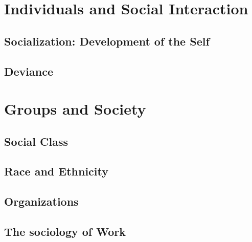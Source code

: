 \documentclass[12pt,a4paper]{article}
\begin{document}
\section{Individuals and Social Interaction}
\subsection{Socialization: Development of the Self}
\subsection{Deviance}

\section{Groups and Society}
\subsection{Social Class}
\subsection{Race and Ethnicity}
\subsection{Organizations}
\subsection{The sociology of Work}
\end{document}
